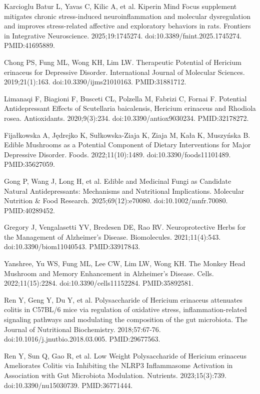 \documentclass[12pt,oneside]{book}
\newcommand{\reff}[2]{\par\hangindent=7mm\hangafter=1\noindent[#1]\hspace{2mm}#2\par}
\begin{document}
\reff{55}{Karcioglu Batur L, Yavas C, Kilic A, et al. Kiperin Mind Focus supplement mitigates chronic stress-induced neuroinflammation and molecular dysregulation and improves stress-related affective and exploratory behaviors in rats. Frontiers in Integrative Neuroscience. 2025;19:1745274. doi:10.3389/fnint.2025.1745274. PMID:41695889.}

\reff{56}{Chong PS, Fung ML, Wong KH, Lim LW. Therapeutic Potential of Hericium erinaceus for Depressive Disorder. International Journal of Molecular Sciences. 2019;21(1):163. doi:10.3390/ijms21010163. PMID:31881712.}

\reff{57}{Limanaqi F, Biagioni F, Busceti CL, Polzella M, Fabrizi C, Fornai F. Potential Antidepressant Effects of Scutellaria baicalensis, Hericium erinaceus and Rhodiola rosea. Antioxidants. 2020;9(3):234. doi:10.3390/antiox9030234. PMID:32178272.}

\reff{58}{Fijałkowska A, Jędrejko K, Sułkowska-Ziaja K, Ziaja M, Kała K, Muszyńska B. Edible Mushrooms as a Potential Component of Dietary Interventions for Major Depressive Disorder. Foods. 2022;11(10):1489. doi:10.3390/foods11101489. PMID:35627059.}

\reff{59}{Gong P, Wang J, Long H, et al. Edible and Medicinal Fungi as Candidate Natural Antidepressants: Mechanisms and Nutritional Implications. Molecular Nutrition \& Food Research. 2025;69(12):e70080. doi:10.1002/mnfr.70080. PMID:40289452.}

\reff{60}{Gregory J, Vengalasetti YV, Bredesen DE, Rao RV. Neuroprotective Herbs for the Management of Alzheimer's Disease. Biomolecules. 2021;11(4):543. doi:10.3390/biom11040543. PMID:33917843.}

\reff{61}{Yanshree, Yu WS, Fung ML, Lee CW, Lim LW, Wong KH. The Monkey Head Mushroom and Memory Enhancement in Alzheimer's Disease. Cells. 2022;11(15):2284. doi:10.3390/cells11152284. PMID:35892581.}

\reff{62}{Ren Y, Geng Y, Du Y, et al. Polysaccharide of Hericium erinaceus attenuates colitis in C57BL/6 mice via regulation of oxidative stress, inflammation-related signaling pathways and modulating the composition of the gut microbiota. The Journal of Nutritional Biochemistry. 2018;57:67-76. doi:10.1016/j.jnutbio.2018.03.005. PMID:29677563.}

\reff{63}{Ren Y, Sun Q, Gao R, et al. Low Weight Polysaccharide of Hericium erinaceus Ameliorates Colitis via Inhibiting the NLRP3 Inflammasome Activation in Association with Gut Microbiota Modulation. Nutrients. 2023;15(3):739. doi:10.3390/nu15030739. PMID:36771444.}
\end{document}
